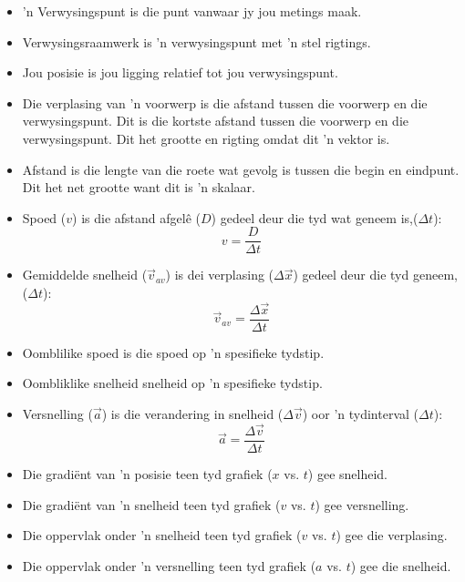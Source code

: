 

\begin{itemize}[noitemsep]
    \item  'n Verwysingspunt is die punt vanwaar jy jou metings maak.
    \item Verwysingsraamwerk is  'n verwysingspunt met  'n stel rigtings.
    \item Jou posisie is jou ligging relatief tot jou verwysingspunt.
    \item Die verplasing van  'n voorwerp is die afstand tussen die voorwerp en die verwysingspunt. Dit is die kortste afstand tussen die voorwerp en die verwysingspunt. Dit het grootte en rigting omdat dit  'n vektor is.
    \item Afstand is die lengte van die roete wat gevolg is tussen die begin en eindpunt. Dit het net grootte want dit is  'n skalaar.
    \item Spoed ($v$) is die afstand afgel\^e ($D$) gedeel deur die tyd wat geneem is,($\Delta t$):
        \begin{equation*}
        v=\frac{D}{\Delta t}
        \end{equation*}
    \item Gemiddelde snelheid ($\vec{v}_{av}$) is dei verplasing ($\Delta \vec{x}$) gedeel deur die tyd geneem,($\Delta t$):
        \label{m38796*id80827}\nopagebreak\noindent{}
        \begin{equation*}
        \vec{v}_{av}=\frac{\Delta \vec{x}}{\Delta t}
        \end{equation*}
    \item Oomblilike spoed is die spoed op  'n spesifieke tydstip.
    \item Oombliklike snelheid snelheid op  'n spesifieke tydstip.
    \item Versnelling ($\vec{a}$) is die verandering in snelheid ($\Delta \vec{v}$) oor  'n tydinterval ($\Delta t$):
        \label{m38796*id80925}\nopagebreak\noindent{}
        \begin{equation*}
        \vec{a}=\frac{\Delta \vec{v}}{\Delta t}
        \end{equation*}
    \item Die gradi\"ent van  'n posisie teen tyd grafiek ($x$ vs. $t$) gee snelheid.
    \item Die gradi\"ent van  'n snelheid teen tyd grafiek ($v$ vs. $t$) gee versnelling.
    \item Die oppervlak onder  'n snelheid teen tyd grafiek ($v$ vs. $t$) gee die verplasing.
    \item Die oppervlak onder  'n versnelling teen tyd grafiek ($a$ vs. $t$) gee die snelheid.

\end{itemize}
